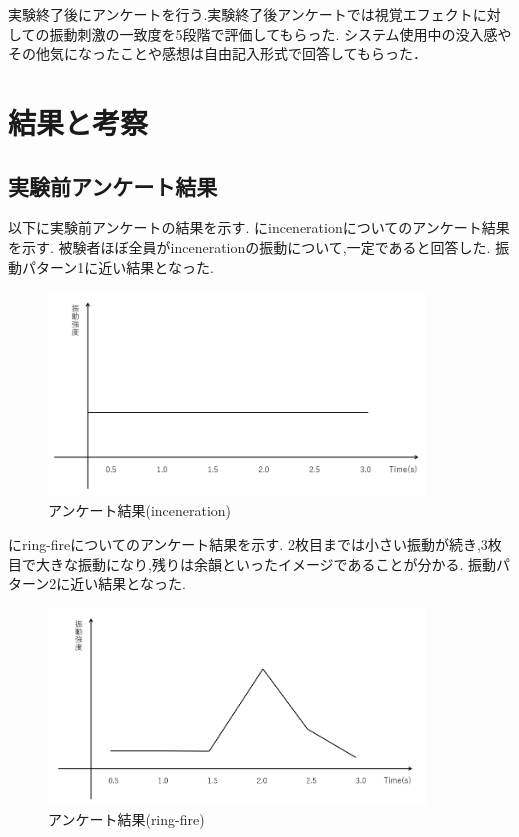 実験終了後にアンケートを行う.実験終了後アンケートでは視覚エフェクトに対しての振動刺激の一致度を5段階で評価してもらった.
システム使用中の没入感やその他気になったことや感想は自由記入形式で回答してもらった．

\newpage

\section{結果と考察}
\subsection{実験前アンケート結果}
以下に実験前アンケートの結果を示す.
にincenerationについてのアンケート結果を示す.
被験者ほぼ全員がincenerationの振動について,一定であると回答した.
振動パターン1に近い結果となった.
\begin{figure}[h]
\centering
\includegraphics[clip,width=10cm]{fig/incenerationAve.png}
\caption{アンケート結果(inceneration)}\label{inceA}
\end{figure}


にring-fireについてのアンケート結果を示す.
2枚目までは小さい振動が続き,3枚目で大きな振動になり,残りは余韻といったイメージであることが分かる.
振動パターン2に近い結果となった.
\begin{figure}[h]
\centering
\includegraphics[clip,width=10cm]{fig/ringfireAve.png}
\caption{アンケート結果(ring-fire)}\label{ringA}
\end{figure}




